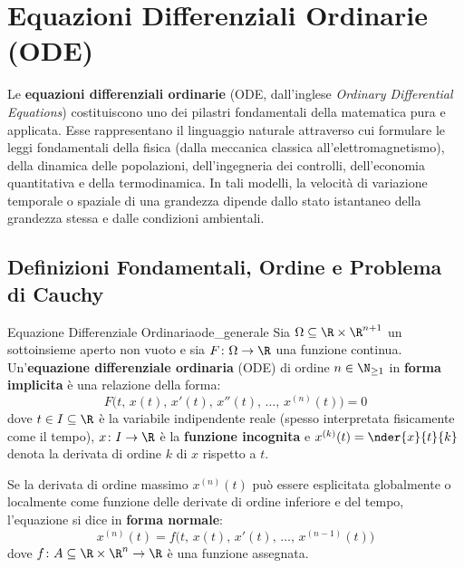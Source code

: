 \chapter{Equazioni Differenziali Ordinarie (ODE)}
\label{chap:equazioni_differenziali}

Le \textbf{equazioni differenziali ordinarie} (ODE, dall'inglese \emph{Ordinary Differential Equations}) costituiscono uno dei pilastri fondamentali della matematica pura e applicata. Esse rappresentano il linguaggio naturale attraverso cui formulare le leggi fondamentali della fisica (dalla meccanica classica all'elettromagnetismo), della dinamica delle popolazioni, dell'ingegneria dei controlli, dell'economia quantitativa e della termodinamica. In tali modelli, la velocità di variazione temporale o spaziale di una grandezza dipende dallo stato istantaneo della grandezza stessa e dalle condizioni ambientali.

\section{Definizioni Fondamentali, Ordine e Problema di Cauchy}
\label{sec:ode_definizioni_cauchy}

\begin{definizione}{Equazione Differenziale Ordinaria}{ode_generale}
Sia $\Omega \subseteq \R \times \R^{n+1}$ un sottoinsieme aperto non vuoto e sia $F \colon \Omega \to \R$ una funzione continua. Un'\textbf{equazione differenziale ordinaria} (ODE) di ordine $n \in \N_{\ge 1}$ in \textbf{forma implicita} è una relazione della forma:
\begin{equation}
    \label{eq:ode_implicita}
    F\big(t, \, x(t), \, x'(t), \, x''(t), \, \dots, \, x^{(n)}(t)\big) = 0
\end{equation}
dove $t \in I \subseteq \R$ è la variabile indipendente reale (spesso interpretata fisicamente come il tempo), $x \colon I \to \R$ è la \textbf{funzione incognita} e $x^{(k)}(t) = \nder{x}{t}{k}$ denota la derivata di ordine $k$ di $x$ rispetto a $t$.

Se la derivata di ordine massimo $x^{(n)}(t)$ può essere esplicitata globalmente o localmente come funzione delle derivate di ordine inferiore e del tempo, l'equazione si dice in \textbf{forma normale}:
\begin{equation}
    \label{eq:ode_normale}
    x^{(n)}(t) = f\big(t, \, x(t), \, x'(t), \, \dots, \, x^{(n-1)}(t)\big)
\end{equation}
dove $f \colon A \subseteq \R \times \R^n \to \R$ è una funzione assegnata.
\end{definizione}

